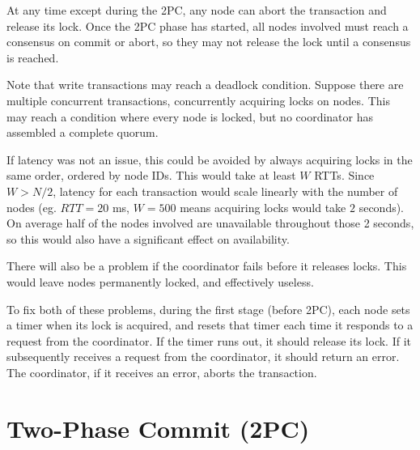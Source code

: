 \documentclass[12pt,a4paper,twoside,openany]{report}
\begin{document}
At any time except during the 2PC, any node can abort the transaction and release its lock. Once the 2PC phase has started, all nodes involved must reach a consensus on commit or abort, so they may not release the lock until a consensus is reached.

Note that write transactions may reach a deadlock condition. Suppose there are multiple concurrent transactions, concurrently acquiring locks on nodes. This may reach a condition where every node is locked, but no coordinator has assembled a complete quorum.

If latency was not an issue, this could be avoided by always acquiring locks in the same order, ordered by node IDs. This would take at least $W$ RTTs. Since $W > N / 2$, latency for each transaction would scale linearly with the number of nodes (eg. $RTT = 20$ ms, $W = 500$ means acquiring locks would take $2$ seconds). On average half of the nodes involved are unavailable throughout those 2 seconds, so this would also have a significant effect on availability.

There will also be a problem if the coordinator fails before it releases locks. This would leave nodes permanently locked, and effectively useless.

To fix both of these problems, during the first stage (before 2PC), each node sets a timer when its lock is acquired, and resets that timer each time it responds to a request from the coordinator. If the timer runs out, it should release its lock. If it subsequently receives a request from the coordinator, it should return an error. The coordinator, if it receives an error, aborts the transaction.

\section{Two-Phase Commit (2PC)}
\end{document}
